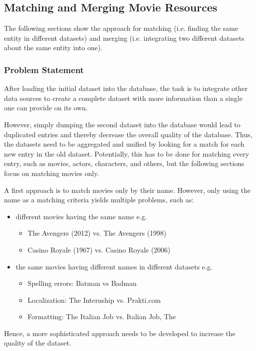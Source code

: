 \subsection{Matching and Merging Movie Resources}
\label{subsec_method_matching}

The following sections show the approach for matching (i.e. finding the same entity in different datasets)
and merging (i.e. integrating two different datasets about the same entity into one).

\subsubsection{Problem Statement}
After loading the initial dataset into the database, the task is to integrate other data sources to create a complete dataset with more information than a single one can provide on its own.

However, simply dumping the second dataset into the database would lead to duplicated entries and thereby decrease the overall quality of the database.
Thus, the datasets need to be aggregated and unified by looking for a match for each new entry in the old dataset.
Potentially, this has to be done for matching every entry, such as movies, actors, characters, and others, but the following sections focus on matching movies only.

A first approach is to match movies only by their name.
However, only using the name as a matching criteria yields multiple problems, such as:
\begin{itemize}
	\item different movies having the same name e.g.
	\begin{itemize}
        \item The Avengers (2012) vs. The Avengers (1998)
        \item Casino Royale (1967) vs. Casino Royale (2006)
    \end{itemize}
	\item the same movies having different names in different datasets e.g.
	\begin{itemize}
        \item Spelling errors: Batman vs Badman
        \item Localization: The Internship vs. Prakti.com
        \item Formatting: The Italian Job vs. Italian Job, The
     \end{itemize}
\end{itemize}
Hence, a more sophisticated approach needs to be developed to increase the quality of the dataset.

